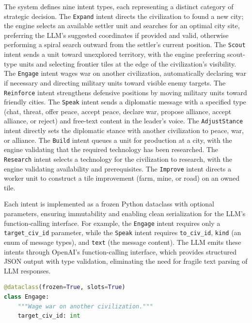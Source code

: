 \documentclass[conference]{IEEEtran}
\begin{document}
The system defines nine intent types, each representing a distinct category of strategic decision. The \texttt{Expand} intent directs the civilization to found a new city; the engine selects an available settler unit and searches for an optimal city site, preferring the LLM's suggested coordinates if provided and valid, otherwise performing a spiral search outward from the settler's current position. The \texttt{Scout} intent sends a unit toward unexplored territory, with the engine preferring scout-type units and selecting frontier tiles at the edge of the civilization's visibility. The \texttt{Engage} intent wages war on another civilization, automatically declaring war if necessary and directing military units toward visible enemy targets. The \texttt{Reinforce} intent strengthens defensive positions by moving military units toward friendly cities. The \texttt{Speak} intent sends a diplomatic message with a specified type (chat, threat, offer peace, accept peace, declare war, propose alliance, accept alliance, or reject) and free-text content in the leader's voice. The \texttt{AdjustStance} intent directly sets the diplomatic stance with another civilization to peace, war, or alliance. The \texttt{Build} intent queues a unit for production at a city, with the engine validating that the required technology has been researched. The \texttt{Research} intent selects a technology for the civilization to research, with the engine validating availability and prerequisites. The \texttt{Improve} intent directs a worker unit to construct a tile improvement (farm, mine, or road) on an owned tile.

Each intent is implemented as a frozen Python dataclass with optional parameters, ensuring immutability and enabling clean serialization for the LLM's function-calling interface. For example, the \texttt{Engage} intent requires only a \texttt{target\_civ\_id} parameter, while the \texttt{Speak} intent requires \texttt{to\_civ\_id}, \texttt{kind} (an enum of message types), and \texttt{text} (the message content). The LLM emits these intents through OpenAI's function-calling interface, which provides structured JSON output with type validation, eliminating the need for fragile text parsing of LLM responses.

\begin{lstlisting}[language=Python]
@dataclass(frozen=True, slots=True)
class Engage:
    """Wage war on another civilization."""
    target_civ_id: int
\end{lstlisting}
\end{document}
